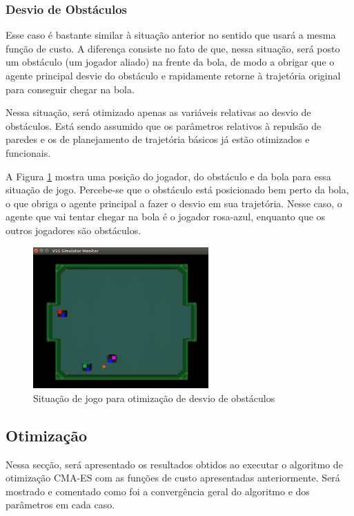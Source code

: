 \documentclass[10pt,fleqn,a4paper]{article}
\begin{document}
\subsubsection{Desvio de Obstáculos}

Esse caso é bastante similar à situação anterior no sentido que usará a mesma função de custo. A diferença consiste no fato de que, nessa situação, será posto um obstáculo (um jogador aliado) na frente da bola, de modo a obrigar que o agente principal desvie do obstáculo e rapidamente retorne à trajetória original para conseguir chegar na bola.

Nessa situação, será otimizado apenas as variáveis relativas ao desvio de obstáculos. Está sendo assumido que os parâmetros relativos à repulsão de paredes e os de planejamento de trajetória básicos já estão otimizados e funcionais.

A Figura \ref{fig:com_obstaculo_simulacao} mostra uma posição do jogador, do obstáculo e da bola para essa situação de jogo. Percebe-se que o obstáculo está posicionado bem perto da bola, o que obriga o agente principal a fazer o desvio em sua trajetória. Nesse caso, o agente que vai tentar chegar na bola é o jogador rosa-azul, enquanto que os outros jogadores são obstáculos.

\begin{figure}[H]
	\centering
	\includegraphics[width=0.6\textwidth]{figures/OtimizacaoComObstaculoSimulacao.png}
	\caption{Situação de jogo para otimização de desvio de obstáculos}
	\label{fig:com_obstaculo_simulacao}
\end{figure}


\subsection{Otimização}

Nessa secção, será apresentado os resultados obtidos ao executar o algoritmo de otimização CMA-ES com as funções de custo apresentadas anteriormente. Será mostrado e comentado como foi a convergência geral do algoritmo e dos parâmetros em cada caso.
\end{document}
